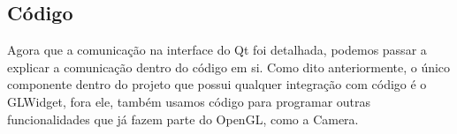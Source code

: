 \subsection{Código}

Agora que a comunicação na interface do Qt foi detalhada,
podemos passar a explicar a comunicação dentro do código em si. Como dito 
anteriormente, o único componente dentro do projeto que possui qualquer 
integração com código é o GLWidget, fora ele, também usamos código para 
programar outras funcionalidades que já fazem parte do OpenGL, como a Camera.
